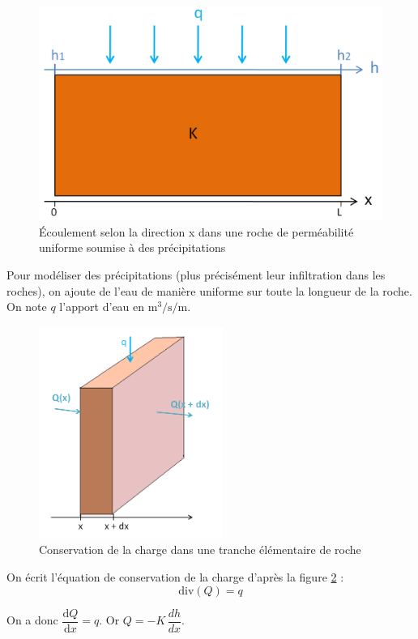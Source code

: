 \documentclass{article}
\begin{document}
\begin{figure}[H]
    \centering
    \includegraphics[width=13cm]{A_III_B_3.png}
    \caption{Écoulement selon la direction x dans une roche de perméabilité uniforme soumise à des précipitations}
    \label{fig:ecoulement_précipitations}
\end{figure}
\newpage
Pour modéliser des précipitations (plus précisément leur infiltration dans les roches), on ajoute de l’eau de manière uniforme sur toute la longueur de la roche. On note $q$ l’apport d’eau en $\text{m}^3/\text{s}/\text{m}$.

\begin{figure}[H]
    \centering
    \includegraphics[width=6cm]{A_III_B_4.png}
    \caption{Conservation de la charge dans une tranche élémentaire de roche}
    \label{fig:schema_carre_ecoulement}%
\end{figure}


On écrit l’équation de conservation de la charge d'après la figure \ref{fig:schema_carre_ecoulement} :
$$ \text{div} (Q)=q$$

On a donc $\dfrac{\text{d}Q}{\text{d}x}=q$.
Or $Q= -K\, \dfrac{dh}{dx}$.
\end{document}
